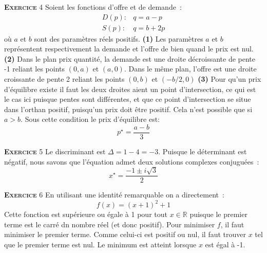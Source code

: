 \documentclass[10pt,a4paper,notitlepage]{article}
\newcommand{\exercice}[1]{\textsc{\textbf{Exercice}} #1}
\begin{document}
\bigskip

\exercice{4} Soient les fonctions d'offre et de demande :
\[
\begin{split}
  D(p):& q = a - p\\
  S(p):& q = b + 2p
\end{split}
\] 
où $a$ et $b$ sont des paramètres réels positifs. \textbf{(1)} Les
paramètres $a$ et $b$ représentent respectivement la demande et
l'offre de bien quand le prix est nul. \textbf{(2)} Dans le plan prix
quantité, la demande est une droite décroissante de pente -1 reliant
les points $(0,a)$ et $(a,0)$. Dans le même plan, l'offre est une
droite croissante de pente 2 reliant les points $(0,b)$ et $(-b/2, 0)$
\textbf{(3)} Pour qu'un prix d'équilibre existe il faut les deux
droites aient un point d'intersection, ce qui est le cas ici puisque
pentes sont différentes, et que ce point d'intersection se situe dans
l'orthan positif, puisqu'un prix doit être positif. Cela n'est
possible que si $a>b$. Sous cette condition le prix d'équilibre est:
\[
p^{\star} = \frac{a-b}{3}
\]

\bigskip

\exercice{5} Le discriminant est $\Delta = 1 - 4 = -3$. Puisque le déterminant est négatif, nous savons que l'équation admet deux solutions complexes conjuguées :
\[
x^{\star} = \frac{-1\pm i\sqrt{3}}{2}
\]

\bigskip

\exercice{6} En utilisant une identité remarquable on a directement :
\[
f(x) = (x+1)^{2} + 1
\]
Cette fonction est supérieure ou égale à 1 pour tout $x\in\mathbb R$
puisque le premier terme est le carré dn nombre réel (et donc positif). Pour minimiser $f$, il faut minimiser le premier terme. Comme celui-ci est positif ou nul, il faut trouver $x$ tel que le premier terme est nul. Le minimum est atteint lorsque $x$ est égal à -1.
\end{document}
